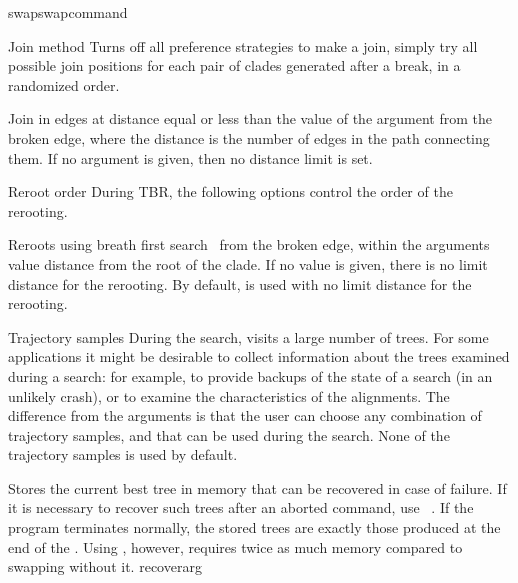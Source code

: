 \begin{command}{swap}{swapcommand}
\begin{arguments}
\begin{argumentgroup}{Join method}
                {Turns off all preference strategies to make a join, simply try
                all possible join positions for each pair of clades generated
                after a break, in a randomized order.}
                {}

                {Join in edges at distance equal or less than the value of the argument
                from the broken edge, where the distance is the number of edges
                in the path connecting them. If no argument is given, then no
                distance limit is set.}
                {}
		
    \end{argumentgroup}

    \begin{argumentgroup}{Reroot order}
        {During TBR, the following options control the order of the rerooting.}

            {Reroots using breath first search~\cite{cormen2001} from the broken edge, within the
            arguments value distance from the root of the clade. If no value is
            given, there is no limit distance for the rerooting. By default, 
            is used with no limit distance for the rerooting.}
            {}

    \end{argumentgroup}

	\begin{argumentgroup}{Trajectory samples}
	{During the search, \poy visits a large number of trees. For some applications
	 it might be desirable to  collect information about the trees examined during a
	 search: for example, to provide backups of the state of a
        search (in an unlikely crash), or to examine the characteristics of the alignments.
        The difference from the  arguments is that the user can
        choose any combination of trajectory samples, and that can be 
        used during the search. None of the trajectory samples is used by
        default.}

	{Stores the current best tree in memory that can be recovered in
            case of failure. If it is necessary to recover such
            trees after an aborted command, use ~. 
            If the program terminates normally, the stored trees are exactly
            those produced at the end of the . Using
            , however, requires twice as much memory
            compared to swapping without it.}
            {recoverarg}


\end{argumentgroup}
\end{arguments}
\end{command}
